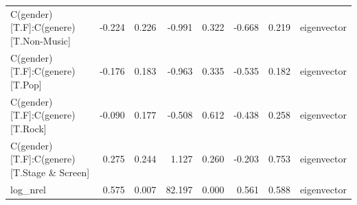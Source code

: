 \begin{table}
\begin{tabular}{lrrrrrrl}
             C(gender)[T.F]:C(genere)[T.Non-Music] & -0.224 & 0.226 &  -0.991 & 0.322 & -0.668 &  0.219 & eigenvector \\
                   C(gender)[T.F]:C(genere)[T.Pop] & -0.176 & 0.183 &  -0.963 & 0.335 & -0.535 &  0.182 & eigenvector \\
                  C(gender)[T.F]:C(genere)[T.Rock] & -0.090 & 0.177 &  -0.508 & 0.612 & -0.438 &  0.258 & eigenvector \\
        C(gender)[T.F]:C(genere)[T.Stage \& Screen] &  0.275 & 0.244 &   1.127 & 0.260 & -0.203 &  0.753 & eigenvector \\
                                          log\_nrel &  0.575 & 0.007 &  82.197 & 0.000 &  0.561 &  0.588 & eigenvector \\
\bottomrule
\end{tabular}
\end{table}
